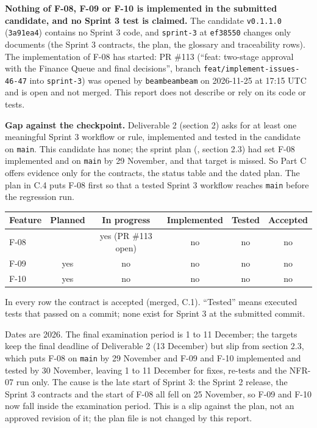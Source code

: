 

\label{C:2}

\textbf{Nothing of F-08, F-09 or F-10 is implemented in the submitted candidate, and no Sprint 3 test is claimed.} The candidate \texttt{v0.1.1.0} (\texttt{3a91ea4}) contains no Sprint 3 code, and \texttt{sprint-3} at \texttt{ef38550} changes only documents (the Sprint 3 contracts, the plan, the glossary and traceability rows). The implementation of F-08 has started: PR \#113 (``feat: two-stage approval with the Finance Queue and final decisions'', branch \texttt{feat/implement-issues-46-47} into \texttt{sprint-3}) was opened by \texttt{beambeambeam} on 2026-11-25 at 17:15 UTC and is open and not merged. This report does not describe or rely on its code or tests.

\textbf{Gap against the checkpoint.} Deliverable 2 (section 2) asks for at least one meaningful Sprint 3 workflow or rule, implemented and tested in the candidate on \texttt{main}. This candidate has none; the sprint plan (, section 2.3) had set F-08 implemented and on \texttt{main} by 29 November, and that target is missed. So Part C offers evidence only for the contracts, the status table and the dated plan. The plan in C.4 puts F-08 first so that a tested Sprint 3 workflow reaches \texttt{main} before the regression run.

\label{C:3}

\begin{center}\small
\begin{tabular}{@{}lccccc@{}}
\toprule \textbf{Feature} & \textbf{Planned} & \textbf{In progress} & \textbf{Implemented} & \textbf{Tested} & \textbf{Accepted} \\ \midrule
F-08 & & yes (PR \#113 open) & no & no & no \\
F-09 & yes & no & no & no & no \\
F-10 & yes & no & no & no & no \\
\bottomrule
\end{tabular}
\end{center}

\noindent In every row the contract is accepted (merged, C.1). ``Tested'' means executed tests that passed on a commit; none exist for Sprint 3 at the submitted commit.

\label{C:4}

Dates are 2026. The final examination period is 1 to 11 December; the targets keep the final deadline of Deliverable 2 (13 December) but slip from  section 2.3, which puts F-08 on \texttt{main} by 29 November and F-09 and F-10 implemented and tested by 30 November, leaving 1 to 11 December for fixes, re-tests and the NFR-07 run only. The cause is the late start of Sprint 3: the Sprint 2 release, the Sprint 3 contracts and the start of F-08 all fell on 25 November, so F-09 and F-10 now fall inside the examination period. This is a slip against the plan, not an approved revision of it; the plan file is not changed by this report.

